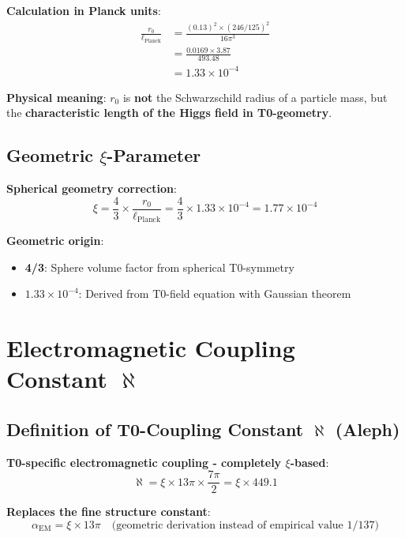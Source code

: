 \documentclass[12pt,a4paper]{article}
\newcommand{\xipar}{\xi}
\newcommand{\alphagem}{\alpha_{\text{EM}}}
\newcommand{\ellPlanck}{\ell_{\text{Planck}}}
\newcommand{\rzero}{r_0}
\begin{document}
	\textbf{Calculation in Planck units}:
	\begin{align}
		\frac{\rzero}{\ellPlanck} &= \frac{(0.13)^2 \times (246/125)^2}{16\pi^3} \\
		&= \frac{0.0169 \times 3.87}{493.48} \\
		&= 1.33 \times 10^{-4}
	\end{align}
	
	\textbf{Physical meaning}: $\rzero$ is \textbf{not} the Schwarzschild radius of a particle mass, but the \textbf{characteristic length of the Higgs field in T0-geometry}.
	
	\subsection{Geometric $\xipar$-Parameter}
	
	\textbf{Spherical geometry correction}:
	\begin{equation}
		\xipar = \frac{4}{3} \times \frac{\rzero}{\ellPlanck} = \frac{4}{3} \times 1.33 \times 10^{-4} = 1.77 \times 10^{-4}
	\end{equation}
	
	\textbf{Geometric origin}:
	\begin{itemize}
		\item \textbf{4/3}: Sphere volume factor from spherical T0-symmetry
		\item \textbf{$1.33 \times 10^{-4}$}: Derived from T0-field equation with Gaussian theorem
	\end{itemize}
	
	\section{Electromagnetic Coupling Constant $\aleph$}
	
	\subsection{Definition of T0-Coupling Constant $\aleph$ (Aleph)}
	
	\textbf{T0-specific electromagnetic coupling - completely $\xipar$-based}:
	\begin{equation}
		\aleph = \xipar \times 13\pi \times \frac{7\pi}{2} = \xipar \times 449.1
	\end{equation}
	
	\textbf{Replaces the fine structure constant}:
	\begin{equation}
		\alphagem = \xipar \times 13\pi \quad \text{(geometric derivation instead of empirical value 1/137)}
	\end{equation}
	
\end{document}
